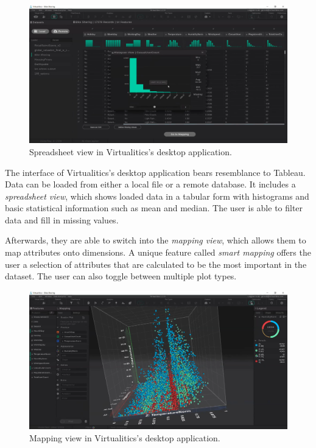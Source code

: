 \documentclass[thesis=M,english,hidelinks]{FITthesisXE}[2012/06/26]
\begin{document}
\begin{figure}[ht]
\centering
\includegraphics[scale=0.2]{virtualitics_spreadsheet}
\caption{Spreadsheet view in Virtualitics's desktop application.\autocite{virtualiticsvideo}}
\label{fig:virtualitics_spreadsheet}
\end{figure}

The interface of Virtualitics's desktop application bears resemblance to Tableau. Data can be loaded from either a local file or a remote database. It includes a \emph{spreadsheet view}, which shows loaded data in a tabular form with histograms and basic statistical information such as mean and median. The user is able to filter data and fill in missing values.

\newpage

Afterwards, they are able to switch into the \emph{mapping view}, which allows them to map attributes onto dimensions. A unique feature called \emph{smart mapping} offers the user a selection of attributes that are calculated to be the most important in the dataset. The user can also toggle between multiple plot types.

\begin{figure}[ht]
\centering
\includegraphics[scale=0.2]{virtualitics_mapping}
\caption{Mapping view in Virtualitics's desktop application.\autocite{virtualiticsvideo}}
\label{fig:virtualitics_mapping}
\end{figure}
\end{document}
